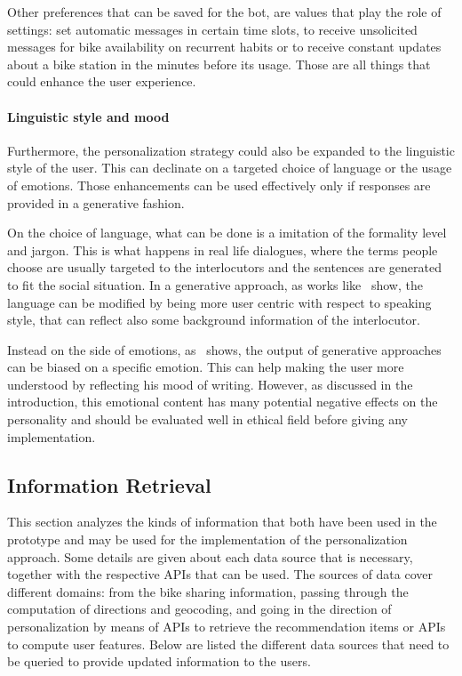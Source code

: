 Other preferences that can be saved for the bot, are values that play the role of settings: set automatic messages in certain time slots, to receive unsolicited messages for bike availability on recurrent habits or to receive constant updates about a bike station in the minutes before its usage. Those are all things that could enhance the user experience.

\paragraph{Linguistic style and mood}
Furthermore, the personalization strategy could also be expanded to the linguistic style of the user. This can declinate on a targeted choice of language or the usage of emotions. Those enhancements can be used effectively only if responses are provided in a generative fashion.

On the choice of language, what can be done is a imitation of the formality level and jargon. This is what happens in real life dialogues, where the terms people choose are usually targeted to the interlocutors and the sentences are generated to fit the social situation. In a generative approach, as works like~\cite{li2016persona} show, the language can be modified by being more user centric with respect to speaking style, that can reflect also some background information of the interlocutor.

Instead on the side of emotions, as~\cite{zhou2017emotional} shows, the output of generative approaches can be biased on a specific emotion. This can help making the user more understood by reflecting his mood of writing. However, as discussed in the introduction, this emotional content has many potential negative effects on the personality and should be evaluated well in ethical field before giving any implementation.

\subsection{Information Retrieval}
\label{approachIR}

This section analyzes the kinds of information that both have been used in the prototype and may be used for the implementation of the personalization approach. Some details are given about each data source that is necessary, together with the respective APIs that can be used. The sources of data cover different domains: from the bike sharing information, passing through the computation of directions and geocoding, and going in the direction of personalization by means of APIs to retrieve the recommendation items or APIs to compute user features. Below are listed the different data sources that need to be queried to provide updated information to the users.

